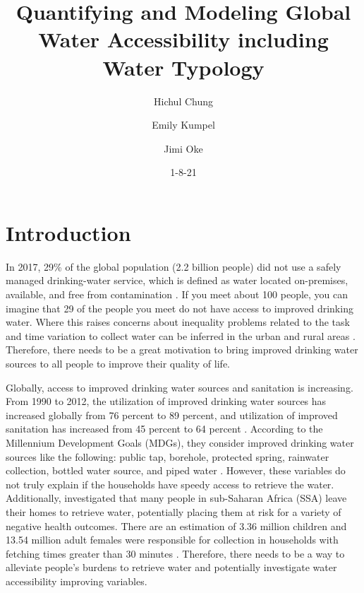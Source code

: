 \documentclass[10pt,twoside]{article}
\numberwithin{equation}{section}
\newcommand{\?}{\stackrel{?}{=}}
\begin{document}
\vspace{-3ex}
\title{Quantifying and Modeling Global Water Accessibility including Water Typology}
\author{Hichul Chung \and Emily Kumpel \and Jimi Oke}
\date{1-8-21}
\maketitle



\section{Introduction}
In 2017, 29\% of the global population (2.2 billion people) did not use a safely managed drinking-water service, which is defined as water located on-premises, available, and free from contamination \citep{WHOdrinkingwater}.   If you meet about 100 people, you can imagine that 29 of the people you meet do not have access to improved drinking water. Where this raises concerns about inequality problems related to the task and time variation 
to collect water can be inferred in the urban and rural areas \citep{cassivi2018access}. Therefore, there needs to be a
great motivation to bring improved drinking water sources to all people to improve their quality of life.


Globally, access to improved drinking water sources and sanitation is increasing. From 1990 to 2012, the utilization of
improved drinking water sources has increased globally from 76 percent to 89 percent, and utilization of improved
sanitation has increased from 45 percent to 64 percent \citep{fuller2016tracking}. According to the Millennium Development Goals (MDGs),
they consider improved drinking water sources like the following: public tap, borehole, protected spring, rainwater
collection, bottled water source, and piped water \citep{bartram_global_2014}. However, these variables do not truly
explain if the households have speedy access to retrieve the water. Additionally, \citet{graham_analysis_2016} investigated that many people in sub-Saharan Africa (SSA) leave their homes to retrieve water, potentially placing them at risk for a variety of negative health outcomes. There are an estimation of 3.36 million children and 13.54 million adult females were responsible for collection in households with fetching times greater than 30 minutes \citep{graham_analysis_2016}. Therefore, there needs to be a way to alleviate people's burdens to retrieve water and potentially investigate water accessibility improving variables. 
\end{document}
